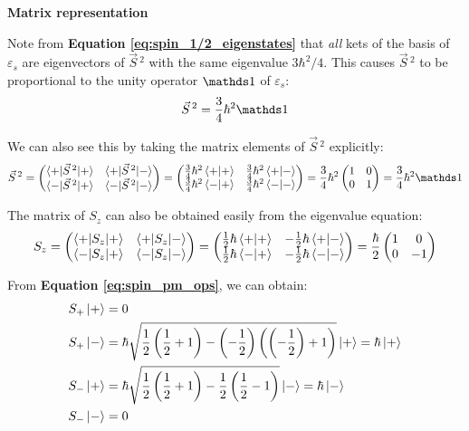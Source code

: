 \textbf{Matrix representation}

Note from \textbf{Equation \ref{eq:spin_1/2_eigenstates}} that \textit{all} kets of the basis of $\varepsilon_s$ are eigenvectors of $\vec{S}\,^2$ with the same eigenvalue $3\hbar^2/4$. This causes $\vec{S}\,^2$ to be proportional to the unity operator $\Imat$ of $\varepsilon_s$:
\begin{equation}
    \vec{S}\,^2 = \frac{3}{4}\hbar^2\Imat
\end{equation}

We can also see this by taking the matrix elements of $\vec{S}\,^2$ explicitly:
\begin{equation}
    \vec{S}\,^2 = \begin{pmatrix}
        \braket{+|\vec{S}\,^2|+} & \braket{+|\vec{S}\,^2|-} \\
        \braket{-|\vec{S}\,^2|+} & \braket{-|\vec{S}\,^2|-}
    \end{pmatrix} = \begin{pmatrix}
        \frac34\hbar^2\braket{+|+} & \frac34\hbar^2\braket{+|-} \\
        \frac34\hbar^2\braket{-|+} & \frac34\hbar^2\braket{-|-}
    \end{pmatrix} =\frac{3}{4}\hbar^2\begin{pmatrix}
        1 & 0 \\
        0 & 1
    \end{pmatrix} = \frac{3}{4}\hbar^2\Imat
\end{equation}

The matrix of $S_z$ can also be obtained easily from the eigenvalue equation:
\begin{equation}
    S_z = \begin{pmatrix}
        \braket{+|S_z|+} & \braket{+|S_z|-} \\
        \braket{-|S_z|+} & \braket{-|S_z|-}
    \end{pmatrix} = \begin{pmatrix}
        \frac12\hbar\braket{+|+} & -\frac12\hbar\braket{+|-} \\
        \frac12\hbar\braket{-|+} & -\frac12\hbar\braket{-|-}
    \end{pmatrix} =\frac{\hbar}{2}\begin{pmatrix}
        1 & 0 \\
        0 & -1
    \end{pmatrix}
\end{equation}

From \textbf{Equation \ref{eq:spin_pm_ops}}, we can obtain:
\begin{equation}
    \begin{split}
        S_+\ket{+} &= 0 \\
        S_+\ket{-} &= \hbar \sqrt{\frac12\left(\frac12+1\right)-\left(-\frac12\right)\left(\left(-\frac12\right)+1\right)}\ket{+} = \hbar\ket{+} \\
        S_-\ket{+} &= \hbar \sqrt{\frac12\left(\frac12+1\right)-\frac12\left(\frac12-1\right)}\ket{-} = \hbar\ket{-} \\
        S_-\ket{-} &= 0
    \end{split}
\end{equation}

